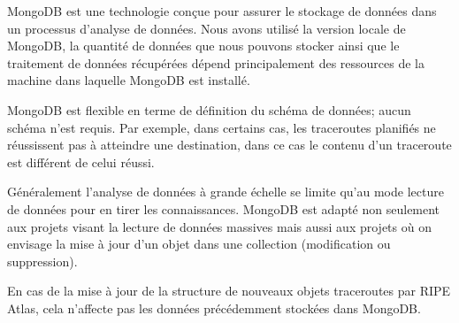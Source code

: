  
 MongoDB est une technologie conçue pour assurer  le stockage de données dans un processus d'analyse de données. Nous avons utilisé la version locale de MongoDB, la quantité de données que nous pouvons stocker ainsi que le traitement de données récupérées dépend principalement des ressources de la machine dans laquelle MongoDB est installé.
 
    MongoDB est flexible en terme de définition du schéma de données; aucun schéma n'est requis.   Par exemple, dans certains cas, les traceroutes planifiés ne réussissent pas à atteindre une destination, dans ce cas le contenu d'un traceroute est différent de celui réussi. 
    
    Généralement l'analyse de données à grande échelle se limite qu'au mode lecture de données pour en tirer les connaissances. MongoDB est adapté non seulement aux projets visant la lecture de données massives mais aussi aux projets où on envisage la mise à jour d'un objet dans une collection (modification ou suppression). 
 
 En cas de la  mise à jour de la structure de nouveaux  objets traceroutes par RIPE Atlas,  cela n'affecte pas les données précédemment  stockées  dans MongoDB.
 









